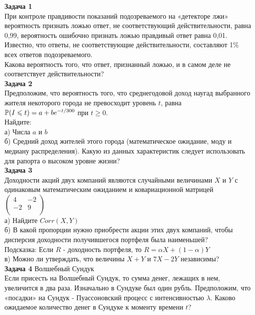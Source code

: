 \documentclass[12pt, a4paper]{article}\usepackage[]{graphicx}\usepackage[]{color}
\begin{document}
	\textbf{Задача 1} \\ %
	При контроле правдивости показаний подозреваемого на «детекторе лжи» вероятность признать ложью ответ, не соответствующий действительности, равна 0,99, вероятность ошибочно признать ложью правдивый ответ равна 0,01. Известно, что ответы, не соответствующие действительности, составляют 1\% всех ответов подозреваемого. \\
	Какова вероятность того, что ответ, признанный ложью, и в самом деле не соответствует действительности?\\

	\textbf{Задача 2} \\
	Предположим, что вероятность того, что среднегодовой доход наугад выбранного жителя некоторого города не превосходит уровень $t$, равна $\P(I\le t)=a+be^{-t/300}$ при $t\ge 0$. \\
	Найдите: \\
	а) Числа $a$ и $b$ \\
	б) Средний доход жителей этого города (математическое ожидание, моду и медиану распределения). Какую из данных характеристик следует использовать для рапорта о высоком уровне жизни? \\

	\textbf{Задача 3} \\
	Доходности акций двух компаний являются случайными величинами $X$ и $Y$ с одинаковым математическим ожиданием и ковариационной матрицей $\left( \begin{array}{cc}
	4 & -2  \\
	-2 & 9  \\
	\end{array}\right)$  \\
	а) Найдите $Corr(X,Y)$ \\
	б) В какой пропорции нужно приобрести акции этих двух компаний, чтобы дисперсия доходности получившегося портфеля была наименьшей? \\
	Подсказка: Если $R$ - доходность портфеля, то $R=\alpha X+(1-\alpha)Y$ \\
	в) Можно ли утверждать, что величины $X+Y$ и $7X-2Y$ независимы? \\

	\textbf{Задача 4} Волшебный Сундук \\
	Если присесть на Волшебный Сундук, то сумма денег, лежащих в нем, увеличится в два раза. Изначально в Сундуке был один рубль. Предположим, что «посадки» на Сундук - Пуассоновский процесс с интенсивностью $\lambda$. Каково ожидаемое количество денег в Сундуке к моменту времени $t$? \\
\end{document}
